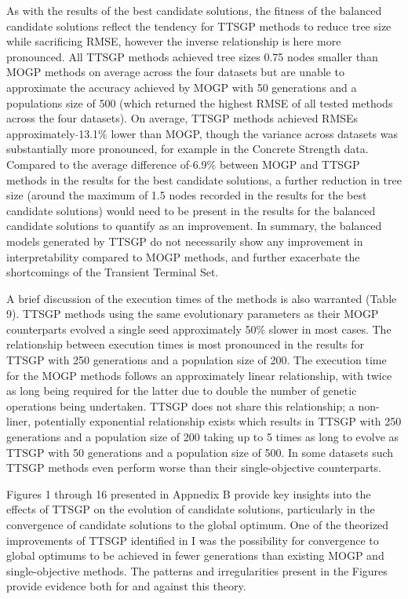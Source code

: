 \documentclass[a4paper, twocolumn]{article}
\begin{document}
As with the results of the best candidate solutions, the fitness of the balanced candidate solutions reflect the tendency for TTSGP methods to reduce tree size while sacrificing RMSE, however the inverse relationship is here more pronounced. All TTSGP methods achieved tree sizes 0.75 nodes smaller than MOGP methods on average across the four datasets but are unable to approximate the accuracy achieved by MOGP with 50 generations and a populations size of 500 (which returned the highest RMSE of all tested methods across the four datasets). On average, TTSGP methods achieved RMSEs approximately $\tilde{}$13.1\% lower than MOGP, though the variance across datasets was substantially more pronounced, for example in the Concrete Strength data. Compared to the average difference of $\tilde{}$6.9\% between MOGP and TTSGP methods in the results for the best candidate solutions, a further reduction in tree size (around the maximum of 1.5 nodes recorded in the results for the best candidate solutions) would need to be present in the results for the balanced candidate solutions to quantify as an improvement. In summary, the balanced models generated by TTSGP do not necessarily show any improvement in interpretability compared to MOGP methods, and further exacerbate the shortcomings of the Transient Terminal Set. 

A brief discussion of the execution times of the methods is also warranted (Table 9). TTSGP methods using the same evolutionary parameters as their MOGP counterparts evolved a single seed approximately 50\% slower in most cases. The relationship between execution times is most pronounced in the results for TTSGP with 250 generations and a population size of 200. The execution time for the MOGP methods follows an approximately linear relationship, with twice as long being required for the latter due to double the number of genetic operations being undertaken. TTSGP does not share this relationship; a non-liner, potentially exponential relationship exists which results in TTSGP with 250 generations and a population size of 200 taking up to 5 times as long to evolve as TTSGP with 50 generations and a population size of 500. In some datasets such TTSGP methods even perform worse than their single-objective counterparts.

Figures 1 through 16 presented in Appnedix B provide key insights into the effects of TTSGP on the evolution of candidate solutions, particularly in the convergence of candidate solutions to the global optimum. One of the theorized improvements of TTSGP identified in I was the possibility for convergence to global optimums to be achieved in fewer generations than existing MOGP and single-objective methods. The patterns and irregularities present in the Figures provide evidence both for and against this theory.
\end{document}
